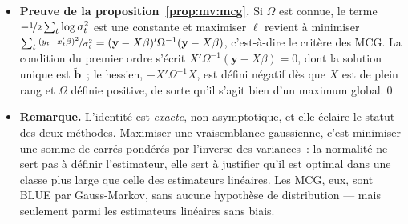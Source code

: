 \documentclass[10pt,a4paper]{article}
\theoremstyle{definition}
\renewcommand{\newline}{\unskip\par\vspace{1.5pt}}
\begin{document}
\begin{notes}

  \begin{itemize}

  \item \textbf{Preuve de la proposition~\ref{prop:mv:mcg}.} Si $\Omega$ est
    connue, le terme $-\nicefrac{1}{2}\sum_t\log\sigma_t^2$ est une constante et
    maximiser $\ell$ revient à minimiser
    $\sum_t\nicefrac{(y_t-x_t'\beta)^2}{\sigma_t^2} =
    (\mathbf y - X\beta)'\Omega^{-1}(\mathbf y - X\beta)$,
    c'est-à-dire le critère des MCG\@. La condition du premier ordre s'écrit
    $X'\Omega^{-1}(\mathbf y - X\beta) = 0$, dont la solution unique est
    $\tilde{\mathbf b}$~; le hessien, $-X'\Omega^{-1}X$, est défini négatif dès
    que $X$ est de plein rang et $\Omega$ définie positive, de sorte qu'il
    s'agit bien d'un maximum global.\qed\newline

  \item \textbf{Remarque.} L'identité est \emph{exacte}, non asymptotique, et
    elle éclaire le statut des deux méthodes. Maximiser une vraisemblance
    gaussienne, c'est minimiser une somme de carrés pondérés par l'inverse des
    variances~: la normalité ne sert pas à définir l'estimateur, elle sert à
    justifier qu'il est optimal dans une classe plus large que celle des
    estimateurs linéaires. Les MCG, eux, sont BLUE par Gauss-Markov, sans
    aucune hypothèse de distribution — mais seulement parmi les estimateurs
    linéaires sans biais.

  \end{itemize}

\end{notes}
\end{document}
